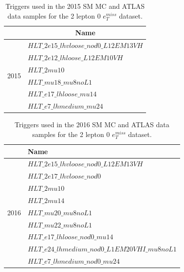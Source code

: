 \begin{table}[H]
    \centering
    
    \begin{tabular}{|l|l|}
    \hline
                          & \multicolumn{1}{c|}{Name}              \\ \hline
    \multirow{6}{*}{2015} & $HLT\_2e15\_lhvloose\_nod0\_L12EM13VH$ \\ \cline{2-2} 
                          & $HLT\_2e12\_lhloose\_L12EM10VH$          \\ \cline{2-2} 
                          & $HLT\_2mu10$                           \\ \cline{2-2} 
                          & $HLT\_mu18\_mu8noL1$                   \\ \cline{2-2} 
                          & $HLT\_e17\_lhloose\_mu14$              \\ \cline{2-2} 
                          & $HLT\_e7\_lhmedium\_mu24$              \\ \hline
    \end{tabular}
    \caption[2015 triggers table]{Triggers used in the 2015 SM MC and ATLAS data samples for the 2 lepton 0 $e_T^{miss}$ dataset.}
    \label{tab:triggers2015}
    \end{table}



\begin{table}[H]
    \centering
    
    \begin{tabular}{|l|l|}
    \hline
                          & Name  \\ \hline
    \multirow{9}{*}{2016} & $HLT\_2e15\_lhvloose\_nod0\_L12EM13VH$                 \\ \cline{2-2} 
                          & $HLT\_2e17\_lhvloose\_nod0$                   \\ \cline{2-2} 
                          & $HLT\_2mu10$                  \\ \cline{2-2} 
                          & $HLT\_2mu14$                  \\ \cline{2-2} 
                          & $HLT\_mu20\_mu8noL1$                  \\ \cline{2-2} 
                          & $HLT\_mu22\_mu8noL1$                 \\ \cline{2-2} 
                          & $HLT\_e17\_lhloose\_nod0\_mu14$                   \\ \cline{2-2} 
                          & $HLT\_e24\_lhmedium\_nod0\_L1EM20VHI\_mu8noL1$                  \\ \cline{2-2} 
                          & $HLT\_e7\_lhmedium\_nod0\_mu24$                   \\ \hline
    \end{tabular}
    \caption[2016 triggers table]{Triggers used in the 2016 SM MC and ATLAS data samples for the 2 lepton 0 $e_T^{miss}$ dataset.}
    \label{tab:triggers2016}
    \end{table}




